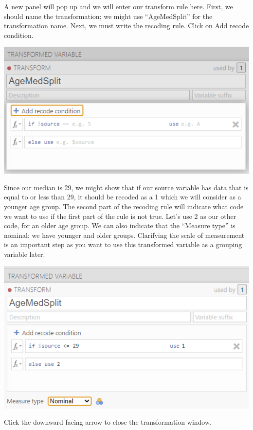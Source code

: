 \documentclass[
]{book}
\begin{document}
A new panel will pop up and we will enter our transform rule here. First, we should name the transformation; we might use ``AgeMedSplit'' for the transformation name. Next, we must write the recoding rule. Click on {Add recode condition}.

\includegraphics{img/TransformingAgeVariable3.png}

Since our median is 29, we might show that if our source variable has data that is equal to or less than 29, it should be recoded as a 1 which we will consider as a younger age group. The second part of the recoding rule will indicate what code we want to use if the first part of the rule is not true. Let's use 2 as our other code, for an older age group. We can also indicate that the ``Measure type'' is nominal; we have younger and older groups. Clarifying the scale of measurement is an important step as you want to use this transformed variable as a grouping variable later.

\includegraphics{img/TransformingAgeVariable4.png}

Click the downward facing arrow to close the transformation window.
\end{document}
